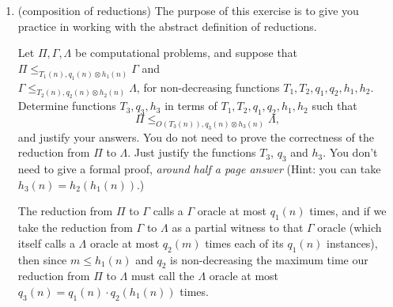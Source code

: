 \documentclass[11pt]{article}
\begin{document}
\begin{enumerate}
\begin{enumerate}
\begin{mysolution}
    	\qquad Since each quadrant (relative to $(1,1)$) can't have more points than the entire polygon does, each of the 4 calls to $SortingOracle$ is performed on a subgroup of at most $n$ entries. And the reduction algorithm itself performs $O(n)$ steps for slope calculations, $O(n)$ setup of the oracle calls' input arrays, $O(n)$ for concatenation, and $O(n)$ for calculating $n$ partial triangles' areas and adding them together. Plus some other $O(1)$ stuff like returning. So in total AreaOfConvexPolygon$\leq_{O(n),4\otimes n}$ Sorting, which by similar logic to 1b proves there's a way to solve AreaOfConvexPolygon in $O(n \log n)$. However, since our reduction doesn't use trigonometry, and a witness $MergeSort$ to the sorting oracle also doesn't use trigonometry, we know that this solving in $O(n \log n)$ can happen without trigonometry, either.
    \end{mysolution}


    \end{enumerate}
    
    Similar techniques to what you are using in this problem are used in algorithms for other important geometric problems, like finding the Convex Hull of a set of points, which has applications in graphics and machine learning.

    \item (composition of reductions) 
    The purpose of this exercise is to give you practice in working with the abstract definition of reductions. 
    
    Let $\Pi, \Gamma, \Lambda$ be computational problems, and suppose that $\Pi\leq_{T_1(n),q_1(n)\otimes h_1(n)} \Gamma$ and \\ $\Gamma \leq_{T_2(n),q_2(n)\otimes h_2(n)} \Lambda$, for non-decreasing functions $T_1,T_2,q_1,q_2,h_1,h_2$.  Determine functions $T_3,q_3,h_3$ in terms of $T_1,T_2,q_1,q_2,h_1,h_2$ such that 
    $$\Pi \leq_{O(T_3(n)),q_3(n)\otimes h_3(n)} \Lambda,$$
    and justify your answers. You do not need to prove the correctness of the reduction from $\Pi$ to $\Lambda$. Just justify the functions $T_3$, $q_3$ and $h_3$. You don't need to give a formal proof, \textit{around half a page answer} (Hint: you can take $h_3(n)=h_2(h_1(n))$.) 

    \begin{mysolution}
    	\qquad The reduction from $\Pi$ to $\Gamma$ calls a $\Gamma$ oracle at most $q_1(n)$ times, and if we take the reduction from $\Gamma$ to $\Lambda$ as a partial witness to that $\Gamma$ oracle (which itself calls a $\Lambda$ oracle at most $q_2(m)$ times each of its $q_1(n)$ instances), then since $m\leq h_1(n)$ and $q_2$ is non-decreasing the maximum time our reduction from $\Pi$ to $\Lambda$ must call the $\Lambda$ oracle at most $q_3(n)=q_1(n)\cdot q_2(h_1(n))$ times.
    	

\end{mysolution}
\end{enumerate}
\end{document}
